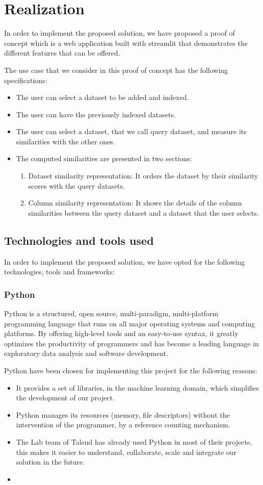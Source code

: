 \chapter{Realization}
In order to implement the proposed solution, we have proposed a proof of concept
which is a web application built with streamlit that demonstrates the different
features that can be offered.

The use case that we consider in this proof of concept has the following specifications:
\begin{itemize}
    \item The user can select a dataset to be added and indexed.
    \item The user can have the previously indexed datasets.
    \item The user can select a dataset, that we call query dataset, and measure
    its similarities with the other ones.
    \item The computed similarities are presented in two sections:
    \begin{enumerate}
        \item Dataset similarity representation: It orders the dataset by their
        similarity scores with the query datasets.
        \item Column similarity representation: It shows the details of the
        column similarities between the query dataset and a dataset that the
        user selects.
    \end{enumerate}
\end{itemize}


\section{Technologies and tools used}
In order to implement the proposed solution, we have opted for the following
technologies, tools and frameworks:
\subsection{Python}
Python is a structured, open source, multi-paradigm, multi-platform programming
language that runs on all major operating systems and computing platforms. By
offering high-level tools and an easy-to-use syntax, it greatly optimizes the
productivity of programmers and has become a leading language in exploratory
data analysis and software development.

Python have been chosen for implementing this project for the following reasons:
\begin{itemize}
    \item It provides a set of libraries, in the machine learning domain, which
    simplifies the development of our project.
    \item Python manages its resources (memory, file descriptors) without the
    intervention of the programmer, by a reference counting mechanism.
    \item The Lab team of Talend has already used Python in most of their
    projects, this makes it easier to understand, collaborate, scale and
    integrate our solution in the future.
    \item 
\end{itemize}

